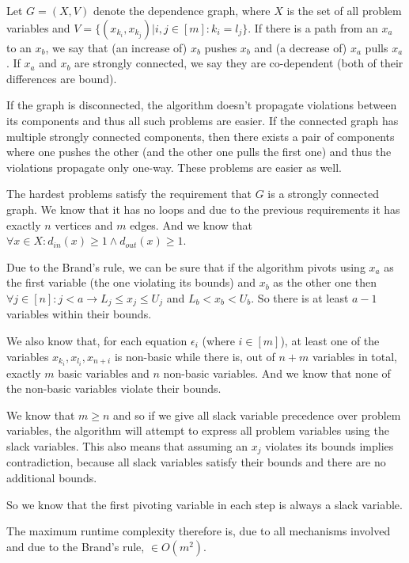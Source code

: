 \documentclass[a4paper,12pt]{article} %
\begin{document}
Let $G = (X, V)$ denote the dependence graph, where $X$ is the set of all problem variables and $V = \{(x_{k_i}, x_{k_j}) | i, j \in [m] : k_i = l_j\}$. If there is a path from an $x_a$ to an $x_b$, we say that (an increase of) $x_b$ pushes $x_b$ and (a decrease of) $x_a$ pulls $x_a$. If $x_a$ and $x_b$ are strongly connected, we say they are co-dependent (both of their differences are bound).

If the graph is disconnected, the algorithm doesn't propagate violations between its components and thus all such problems are easier. If the connected graph has multiple strongly connected components, then there exists a pair of components where one pushes the other (and the other one pulls the first one) and thus the violations propagate only one-way. These problems are easier as well.

The hardest problems satisfy the requirement that $G$ is a strongly connected graph. We know that it has no loops and due to the previous requirements it has exactly $n$ vertices and $m$ edges. And we know that $\forall x \in X : d_{in}(x) \geq 1 \wedge d_{out}(x) \geq 1$.

Due to the Brand's rule, we can be sure that if the algorithm pivots using $x_a$ as the first variable (the one violating its bounds) and $x_b$ as the other one then $\forall j \in [n]: j < a \to L_j  \leq x_j \leq U_j$ and $L_b < x_b < U_b$. So there is at least $a - 1$ variables within their bounds.

We also know that, for each equation $\epsilon_i$ (where $i \in [m]$), at least one of the variables $x_{k_i}, x_{l_i}, x_{n+i}$ is non-basic while there is, out of $n + m$ variables in total, exactly $m$ basic variables and $n$ non-basic variables. And we know that none of the non-basic variables violate their bounds.

We know that $m \geq n$ and so if we give all slack variable precedence over problem variables, the algorithm will attempt to express all problem variables using the slack variables. This also means that assuming an $x_j$ violates its bounds implies contradiction, because all slack variables satisfy their bounds and there are no additional bounds.

So we know that the first pivoting variable in each step is always a slack variable.

The maximum runtime complexity therefore is, due to all mechanisms involved and due to the Brand's rule, $\in O(m^2)$.
\end{document}
